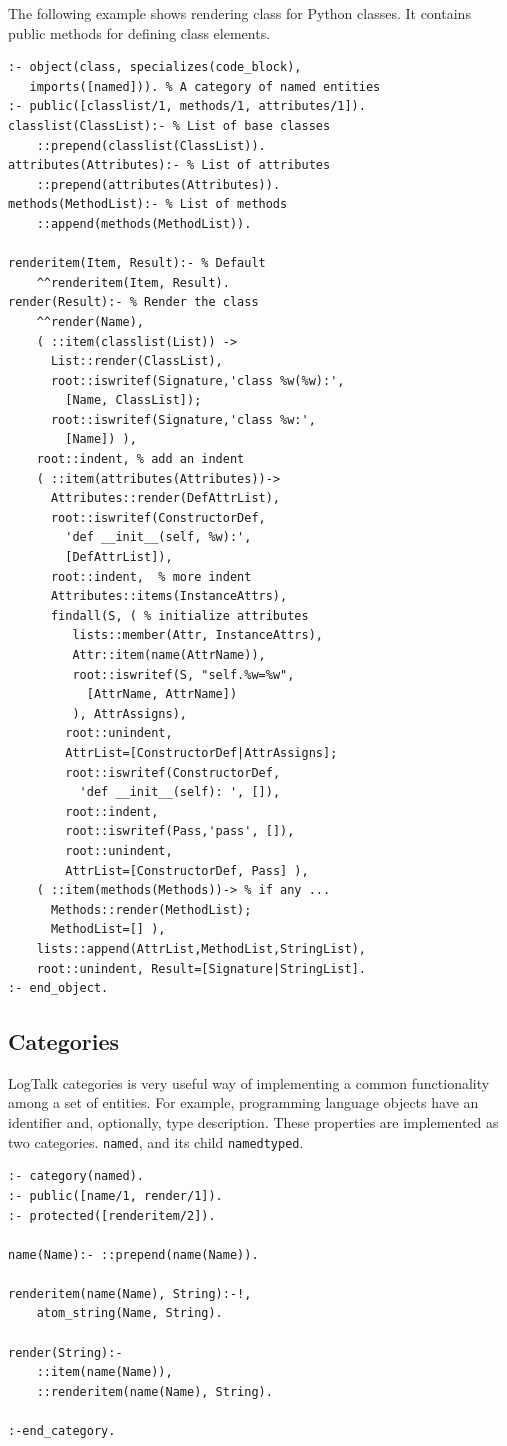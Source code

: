 \documentclass[conference]{IEEEtran}
\begin{document}
The following example shows rendering class for Python classes. It contains public methods for defining class elements.
\begin{multicols}{2}
\begin{verbatim}
:- object(class, specializes(code_block),
   imports([named])). % A category of named entities
:- public([classlist/1, methods/1, attributes/1]).
classlist(ClassList):- % List of base classes
    ::prepend(classlist(ClassList)).
attributes(Attributes):- % List of attributes
    ::prepend(attributes(Attributes)).
methods(MethodList):- % List of methods
    ::append(methods(MethodList)).

renderitem(Item, Result):- % Default
    ^^renderitem(Item, Result).
render(Result):- % Render the class
    ^^render(Name),
    ( ::item(classlist(List)) ->
      List::render(ClassList),
      root::iswritef(Signature,'class %w(%w):',
        [Name, ClassList]);
      root::iswritef(Signature,'class %w:',
        [Name]) ),
    root::indent, % add an indent
    ( ::item(attributes(Attributes))->
      Attributes::render(DefAttrList),
      root::iswritef(ConstructorDef,
        'def __init__(self, %w):',
        [DefAttrList]),
      root::indent,  % more indent
      Attributes::items(InstanceAttrs),
      findall(S, ( % initialize attributes
         lists::member(Attr, InstanceAttrs),
         Attr::item(name(AttrName)),
         root::iswritef(S, "self.%w=%w",
           [AttrName, AttrName])
         ), AttrAssigns),
        root::unindent,
        AttrList=[ConstructorDef|AttrAssigns];
        root::iswritef(ConstructorDef,
          'def __init__(self): ', []),
        root::indent,
        root::iswritef(Pass,'pass', []),
        root::unindent,
        AttrList=[ConstructorDef, Pass] ),
    ( ::item(methods(Methods))-> % if any ...
      Methods::render(MethodList);
      MethodList=[] ),
    lists::append(AttrList,MethodList,StringList),
    root::unindent, Result=[Signature|StringList].
:- end_object.
\end{verbatim}
\end{multicols}

\subsection{Categories}
\label{sec:cats-impl}

LogTalk categories is very useful way of implementing a common functionality among a set of entities.  For example, programming language objects have an identifier and, optionally, type description.  These properties are implemented as two categories.
\texttt{named}, and its child \texttt{namedtyped}.
\begin{verbatim}
:- category(named).
:- public([name/1, render/1]).
:- protected([renderitem/2]).

name(Name):- ::prepend(name(Name)).

renderitem(name(Name), String):-!,
    atom_string(Name, String).

render(String):-
    ::item(name(Name)),
    ::renderitem(name(Name), String).

:-end_category.
\end{verbatim}
\end{document}
